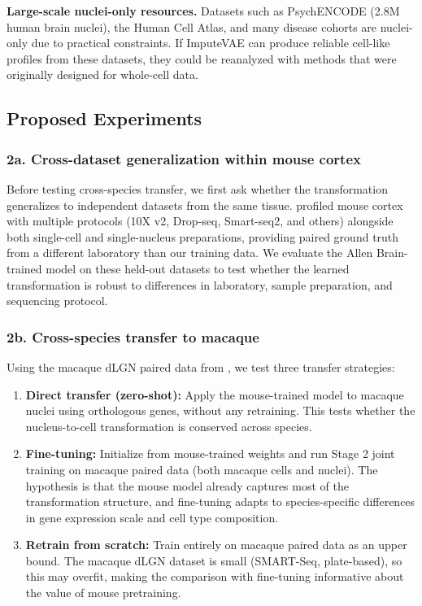 \documentclass[11pt]{article}
\begin{document}
\textbf{Large-scale nuclei-only resources.} Datasets such as PsychENCODE (2.8M human brain nuclei), the Human Cell Atlas, and many disease cohorts are nuclei-only due to practical constraints. If ImputeVAE can produce reliable cell-like profiles from these datasets, they could be reanalyzed with methods that were originally designed for whole-cell data.

\subsection*{Proposed Experiments}

\subsubsection*{2a. Cross-dataset generalization within mouse cortex}

Before testing cross-species transfer, we first ask whether the transformation generalizes to independent datasets from the same tissue. \citet{ding2020systematic} profiled mouse cortex with multiple protocols (10X v2, Drop-seq, Smart-seq2, and others) alongside both single-cell and single-nucleus preparations, providing paired ground truth from a different laboratory than our training data. We evaluate the Allen Brain-trained model on these held-out datasets to test whether the learned transformation is robust to differences in laboratory, sample preparation, and sequencing protocol.

\subsubsection*{2b. Cross-species transfer to macaque}

Using the macaque dLGN paired data from \citet{bakken2021single}, we test three transfer strategies:

\begin{enumerate}[nosep]
    \item \textbf{Direct transfer (zero-shot):} Apply the mouse-trained model to macaque nuclei using orthologous genes, without any retraining. This tests whether the nucleus-to-cell transformation is conserved across species.

    \item \textbf{Fine-tuning:} Initialize from mouse-trained weights and run Stage 2 joint training on macaque paired data (both macaque cells and nuclei). The hypothesis is that the mouse model already captures most of the transformation structure, and fine-tuning adapts to species-specific differences in gene expression scale and cell type composition.

    \item \textbf{Retrain from scratch:} Train entirely on macaque paired data as an upper bound. The macaque dLGN dataset is small (SMART-Seq, plate-based), so this may overfit, making the comparison with fine-tuning informative about the value of mouse pretraining.
\end{enumerate}
\end{document}

